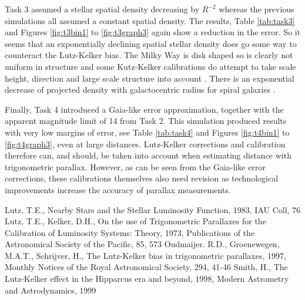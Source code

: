\documentclass[a4paper,12pt]{article}
\begin{document}
Task 3 assumed a stellar spatial density decreasing by $R^{-2}$ whereas the previous simulations all assumed a constant spatial density. The results, Table \ref{tab:task3} and Figures \ref{fig:t3bin1} to \ref{fig:t3graph3} again show a reduction in the error. So it seems that an exponentially declining spatial stellar density does go some way to counteract the Lutz-Kelker bias. The Milky Way is disk shaped so is clearly not uniform in structure and some Kutz-Kelker calibrations do attempt to take scale height, direction and large scale structure into account \citep{smith}. There is an exponential decrease of projected density with galactocentric radius for spiral galaxies \citep{smith}.

Finally, Task 4 introduced a Gaia-like error approximation, together with the apparent magnitude limit of 14 from Task 2. This simulation produced results with very low margins of error, see Table \ref{tab:task4} and Figures \ref{fig:t4bin1} to \ref{fig:t4graph3}, even at large distances. Lutz-Kelker corrections and calibration therefore can, and should, be taken into account when estimating distance with trigonometric parallax. However, as can be seen from the Gaia-like error corrections, these calibrations themselves also need revision as technological improvements increase the accuracy of parallax measurements.

\begin{thebibliography}{1}
Lutz, T.E., Nearby Stars and the Stellar Luminosity Function, 1983, IAU Coll, 76
Lutz, T.E., Kelker, D.H., On the use of Trigonometric Parallaxes for the Calibration of Luminosity Systems: Theory, 1973, Publications of the Astronomical Society of the Pacific, 85, 573
Oudmaijer. R.D., Groenewegen, M.A.T., Schrijver, H., The Lutz-Kelker bias in trigonometric parallaxes, 1997, Monthly Notices of the Royal Astronomical Society, 294, 41-46 
Smith, H., The Lutz-Kelker effect in the Hipparcus era and beyond, 1998, Modern Astrometry and Astrodynamics, 1999
\end{thebibliography}
\end{document}
